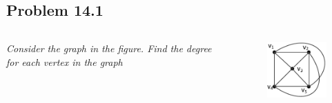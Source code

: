 \documentclass[
        handout,
        ]{beamer}
\begin{document}
        

    \subsection{Problem 14.1}
        \begin{frame}[c]{\subsecname}
            \begin{columns}
                \emph{Consider the graph in the figure. Find the degree for each vertex in the graph}\\$\;$\\
            \column{34mm}
                \begin{figure}
                    \centering
                    \includegraphics[width=34mm]{tut11p13_1}
                \end{figure}
            \end{columns}
        \end{frame}
\end{document}
